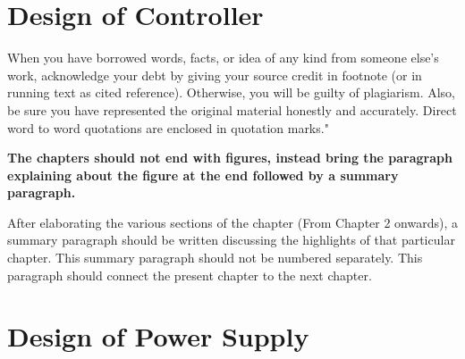 \section{Design of Controller}
When you have borrowed words, facts, or idea of any kind from someone else's work, acknowledge your debt by giving your source credit in footnote (or in running text as cited reference). Otherwise, you will be guilty of plagiarism. Also, be sure you have represented the original material honestly and accurately. Direct word to word quotations are enclosed in quotation marks."

\vspace{0.75cm}

 \textbf{The chapters should not end with figures, instead bring the paragraph explaining about the figure at the end followed by a summary paragraph.}

After elaborating the various sections of the chapter (From Chapter 2 onwards), a summary paragraph should be written discussing the highlights of that particular chapter. This summary paragraph should not be numbered separately. This paragraph should connect the present chapter to the next chapter.  
\section{Design of Power Supply}